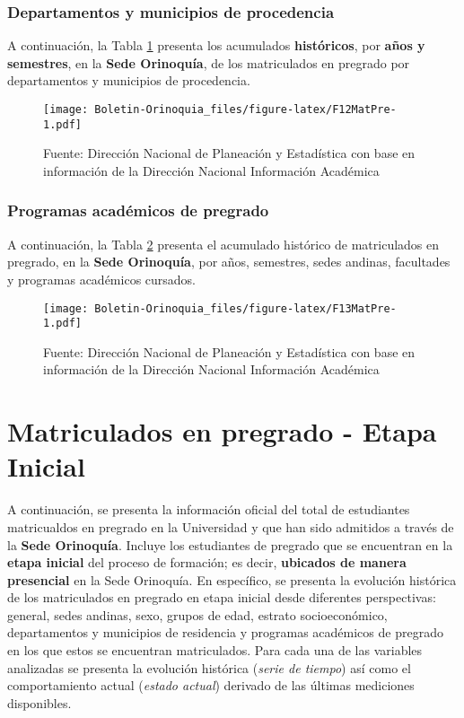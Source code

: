 \documentclass[
]{book}
\begin{document}
\hypertarget{departamentos-y-municipios-de-procedencia-1}{%
\subsubsection{Departamentos y municipios de procedencia}\label{departamentos-y-municipios-de-procedencia-1}}

A continuación, la Tabla \ref{fig:F12MatPre} presenta los acumulados \textbf{históricos}, por \textbf{años y semestres}, en la \textbf{Sede Orinoquía}, de los matriculados en pregrado por departamentos y municipios de procedencia.

\begin{figure}
\centering
\texttt{[image: Boletin-Orinoquia\_files/figure-latex/F12MatPre-1.pdf]}
\caption{\label{fig:F12MatPre}Fuente: Dirección Nacional de Planeación y Estadística con base en información de la Dirección Nacional Información Académica}
\end{figure}

\hypertarget{programas-acaduxe9micos-de-pregrado-1}{%
\subsubsection{Programas académicos de pregrado}\label{programas-acaduxe9micos-de-pregrado-1}}

A continuación, la Tabla \ref{fig:F13MatPre} presenta el acumulado histórico de matriculados en pregrado, en la \textbf{Sede Orinoquía}, por años, semestres, sedes andinas, facultades y programas académicos cursados.

\begin{figure}
\centering
\texttt{[image: Boletin-Orinoquia\_files/figure-latex/F13MatPre-1.pdf]}
\caption{\label{fig:F13MatPre}Fuente: Dirección Nacional de Planeación y Estadística con base en información de la Dirección Nacional Información Académica}
\end{figure}

\hypertarget{MatPreIni}{%
\section{Matriculados en pregrado - Etapa Inicial}\label{MatPreIni}}

A continuación, se presenta la información oficial del total de estudiantes matricualdos en pregrado en la Universidad y que han sido admitidos a través de la \textbf{Sede Orinoquía}. Incluye los estudiantes de pregrado que se encuentran en la \textbf{etapa inicial} del proceso de formación; es decir, \textbf{ubicados de manera presencial} en la Sede Orinoquía. En específico, se presenta la evolución histórica de los matriculados en pregrado en etapa inicial desde diferentes perspectivas: general, sedes andinas, sexo, grupos de edad, estrato socioeconómico, departamentos y municipios de residencia y programas académicos de pregrado en los que estos se encuentran matriculados. Para cada una de las variables analizadas se presenta la evolución histórica (\emph{serie de tiempo}) así como el comportamiento actual (\emph{estado actual}) derivado de las últimas mediciones disponibles.
\end{document}
